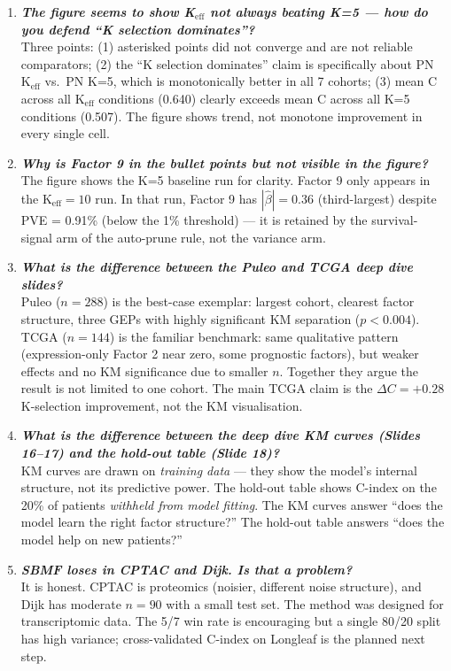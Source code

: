\documentclass[11pt]{article}
\newcommand{\actioncue}[1]{\textit{\textbf{#1}}}
\begin{document}
\begin{enumerate}
\item[\textbf{S14}] \actioncue{The figure seems to show K$_\text{eff}$ not always beating K=5 --- how do you defend ``K selection dominates''?}\\
Three points: (1) asterisked points did not converge and are not reliable comparators; (2) the ``K selection dominates'' claim is specifically about PN K$_\text{eff}$ vs.\ PN K=5, which is monotonically better in all 7 cohorts; (3) mean C across all K$_\text{eff}$ conditions (0.640) clearly exceeds mean C across all K=5 conditions (0.507). The figure shows trend, not monotone improvement in every single cell.

\item[\textbf{S15}] \actioncue{Why is Factor 9 in the bullet points but not visible in the figure?}\\
The figure shows the K=5 baseline run for clarity. Factor 9 only appears in the K$_\text{eff} = 10$ run. In that run, Factor 9 has $|\hat{\beta}| = 0.36$ (third-largest) despite PVE = 0.91\% (below the 1\% threshold) --- it is retained by the survival-signal arm of the auto-prune rule, not the variance arm.

\item[\textbf{S16 vs S17}] \actioncue{What is the difference between the Puleo and TCGA deep dive slides?}\\
Puleo ($n = 288$) is the best-case exemplar: largest cohort, clearest factor structure, three GEPs with highly significant KM separation ($p < 0.004$). TCGA ($n = 144$) is the familiar benchmark: same qualitative pattern (expression-only Factor 2 near zero, some prognostic factors), but weaker effects and no KM significance due to smaller $n$. Together they argue the result is not limited to one cohort. The main TCGA claim is the $\Delta C = +0.28$ K-selection improvement, not the KM visualisation.

\item[\textbf{S17 vs S18}] \actioncue{What is the difference between the deep dive KM curves (Slides 16--17) and the hold-out table (Slide 18)?}\\
KM curves are drawn on \emph{training data} --- they show the model's internal structure, not its predictive power. The hold-out table shows C-index on the 20\% of patients \emph{withheld from model fitting}. The KM curves answer ``does the model learn the right factor structure?'' The hold-out table answers ``does the model help on new patients?''

\item[\textbf{S18}] \actioncue{SBMF loses in CPTAC and Dijk. Is that a problem?}\\
It is honest. CPTAC is proteomics (noisier, different noise structure), and Dijk has moderate $n = 90$ with a small test set. The method was designed for transcriptomic data. The 5/7 win rate is encouraging but a single 80/20 split has high variance; cross-validated C-index on Longleaf is the planned next step.

\end{enumerate}
\end{document}
